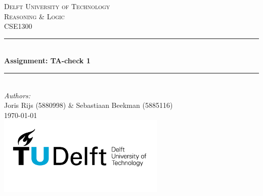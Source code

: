 \documentclass[a4paper]{article}
\begin{document}
\begin{titlepage}
    \newcommand{\HRule}{\rule{\linewidth}{0.5mm}}
    \center

    \textsc{\LARGE Delft University of Technology}\\[1cm]

    \textsc{\Large Reasoning \& Logic}\\[0.2cm]
    \textsc{\large CSE1300}\\[1cm]
    \HRule \\[0.8cm]
    { \huge \bfseries Assignment: TA-check 1}\\[0.7cm]
    \HRule \\[2cm]
    \large
    \emph{Authors:}\\
    Joris Rijs (5880998) \& Sebastiaan Beekman (5885116)\\[1.5cm]
    {\large \today}\\[5cm]
    \includegraphics[width=0.6\textwidth]{images/TU_delft_logo.jpg}\\[1cm]
    \vfill
\end{titlepage}

\newpage
\tableofcontents

\newpage
\end{document}
